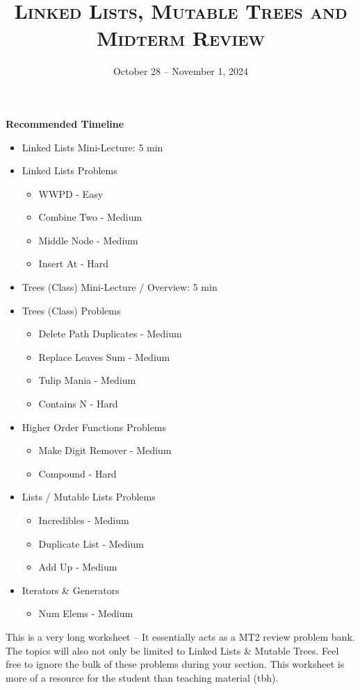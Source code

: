 \documentclass{exam}
\title{\textsc{Linked Lists, Mutable Trees and Midterm Review}}
\date{October 28 -- November 1, 2024}
\begin{document}
\maketitle
\begin{guide}
    \textbf{Recommended Timeline}
    \begin{itemize}
       \item Linked Lists Mini-Lecture: 5 min
       \item Linked Lists Problems {\begin{itemize}
        \item WWPD - Easy
        \item Combine Two - Medium
        \item Middle Node - Medium
        \item Insert At - Hard
    \end{itemize}}
    \item Trees (Class) Mini-Lecture / Overview: 5 min
    \item Trees (Class) Problems {\begin{itemize}
        \item Delete Path Duplicates - Medium
        \item Replace Leaves Sum - Medium 
        \item Tulip Mania - Medium
        \item Contains N - Hard
    \end{itemize}}
    \item Higher Order Functions Problems {\begin{itemize}
        \item Make Digit Remover - Medium
        \item Compound - Hard
    \end{itemize}}
    \item Lists / Mutable Lists Problems {\begin{itemize}
        \item Incredibles - Medium
        \item Duplicate List - Medium
        \item Add Up - Medium
    \end{itemize}}
    \item Iterators \& Generators {\begin{itemize}
        \item Num Elems - Medium
    \end{itemize}}
    \end{itemize}

\begin{meta}
    This is a very long worksheet -- It essentially acts as a MT2 review problem bank. The topics will also not only be limited to Linked Lists \& Mutable Trees. 
    Feel free to ignore the bulk of these problems during your section. This worksheet is more of a resource for the student than teaching material (tbh).
\end{meta}
\end{guide}
\end{document}
